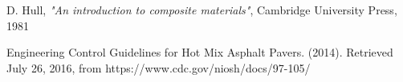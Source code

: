 \documentclass[11pt]{article}
\begin{document}
\newpage
\begin{thebibliography}{9}
D. Hull, \textit{"An introduction to composite materials"}, Cambridge University Press, 1981

Engineering Control Guidelines for Hot Mix Asphalt Pavers. (2014). Retrieved July 26, 2016, from https://www.cdc.gov/niosh/docs/97-105/

\end{thebibliography}
\end{document}
